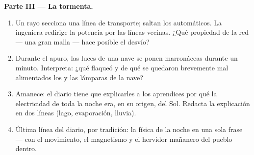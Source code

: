 \begin{problem}
\medskip\noindent\textbf{Parte III --- La tormenta.}
\begin{enumerate}[resume]
  \item Un rayo secciona una línea de transporte; saltan los
        automáticos. La ingeniera redirige la potencia por las
        líneas vecinas. ¿Qué propiedad de la red --- una gran malla  --- hace posible el desvío?
  \item Durante el apuro, las luces de una nave se ponen
        marronáceas durante un minuto. Interpreta: ¿qué flaqueó y de
        qué se quedaron brevemente mal alimentados los
         y las lámparas de la nave?
  \item Amanece: el diario tiene que explicarles a los aprendices
        por qué la electricidad de toda la noche era, en su origen,
         del Sol. Redacta la explicación en dos líneas (lago,
        evaporación, lluvia).
  \item Última línea del diario, por tradición: la física de la
        noche en una sola frase --- con el movimiento, el magnetismo y
        el hervidor mañanero del pueblo dentro.
\end{enumerate}
\end{problem}
